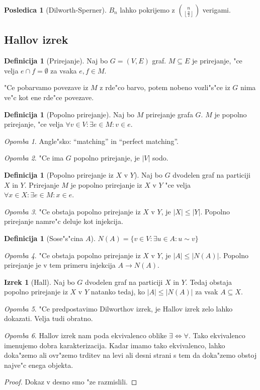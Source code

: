 \documentclass[a4paper,12pt]{article}
\theoremstyle{definition}
\newtheorem{defn}[counter]{Definicija}
\newtheorem{conseq}[counter]{Posledica}
\newtheorem{theorem}[counter]{Izrek}
\theoremstyle{remark}
\newtheorem*{rem}{Opomba}
\begin{document}
\begin{conseq}[Dilworth-Sperner]
	$B_n$ lahko pokrijemo z $\binom{n}{\left\lfloor\frac{n}{2}\right\rfloor}$ verigami.
\end{conseq}

\subsection{Hallov izrek}
\begin{defn}[Prirejanje]
	Naj bo $G=(V, E)$ graf. $M \subseteq E$ je prirejanje, "ce velja $e \cap f = \emptyset$ za vsaka $e, f \in M$.
\end{defn}
"Ce pobarvamo povezave iz $M$ z rde"co barvo, potem nobeno vozli"s"ce iz $G$ nima ve"c kot ene rde"ce povezave.
\begin{defn}[Popolno prirejanje]
	Naj bo $M$ prirejanje grafa $G$. $M$ je popolno prirejanje, "ce velja $\forall v \in V: \exists e \in M: v \in e$.
\end{defn}
\begin{rem}
	Angle"sko: ``matching'' in ``perfect matching''.
\end{rem}
\begin{rem}
	"Ce ima $G$ popolno prirejanje, je $|V|$ sodo.
\end{rem}
\begin{defn}[Popolno prirejanje iz $X$ v $Y$]
	Naj bo $G$ dvodelen graf na particiji $X$ in $Y$. Prirejanje $M$ je popolno prirejanje iz $X$ v $Y$ "ce velja $\forall x \in X: \exists e \in M: x \in e$.
\end{defn}
\begin{rem}
	"Ce obstaja popolno prirejanje iz $X$ v $Y$, je $|X| \leq |Y|$. Popolno prirejanje namre"c deluje kot injekcija.
\end{rem}
\begin{defn}[Sose"s"cina $A$]
	$N(A) = \{v \in V: \exists u \in A: u \sim v\}$
\end{defn}
\begin{rem}
	"Ce obstaja popolno prirejanje iz $X$ v $Y$, je $|A| \leq |N(A)|$. Popolno prirejanje je v tem primeru injekcija $A \rightarrow N(A)$.
\end{rem}
\begin{theorem}[Hall]
	Naj bo $G$ dvodelen graf na particiji $X$ in $Y$. Tedaj obstaja popolno prirejanje iz $X$ v $Y$ natanko tedaj, ko $|A| \leq |N(A)|$ za vsak $A \subseteq X$.
\end{theorem}
\begin{rem}
	"Ce predpostavimo Dilworthov izrek, je Hallov izrek zelo lahko dokazati. Velja tudi obratno.
\end{rem}
\begin{rem}
	Hallov izrek nam poda ekvivalenco oblike $\exists \iff \forall$. Tako ekvivalenco imenujemo dobra karakterizacija. Kadar imamo tako ekvivalenco, lahko doka"zemo ali ovr"zemo trditev na levi ali desni strani s tem da doka"zemo obstoj najve"c enega objekta.
\end{rem}
\begin{proof}
	Dokaz v desno smo "ze razmislili.
\end{proof}
\end{document}
